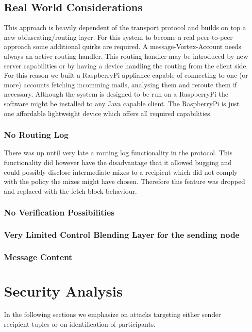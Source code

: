 \section{Real World Considerations}
This approach is heavily dependent of the transport protocol and builds on top a new obfuscating/routing layer. For this system to become a real peer-to-peer approach some additional quirks are required. A message-Vortex-Account needs always an active routing handler. This routing handler may be introduced by new server capabilities or by having a device handling the routing from the client side. For this reason we built a RaspberryPi appliance capable of connecting to one (or more) accounts fetching incomming mails, analysing them and reroute them if necessary. Although the system is designed to be run on a RaspberryPi the software might be installed to any Java capable client. The RaspberryPi is just one affordable lightweight device which offers all required capabilities.

\subsection{No Routing Log}
There was up until very late a routing log functionality in the protocol. This functionality did however have the disadvantage that it allowed bugging and could possibly  disclose intermediate mixes to a recipient which did not comply with the policy the mixes might have chosen. Therefore this feature was dropped and replaced with the fetch block behaviour.

\subsection{No Verification Possibilities}

\subsection{Very Limited Control Blending Layer for the sending node}

\subsection{Message Content}

\chapter{Security Analysis}
In the following sections we emphasize on attacks targeting either sender recipient tuples or on identification of participants. 

